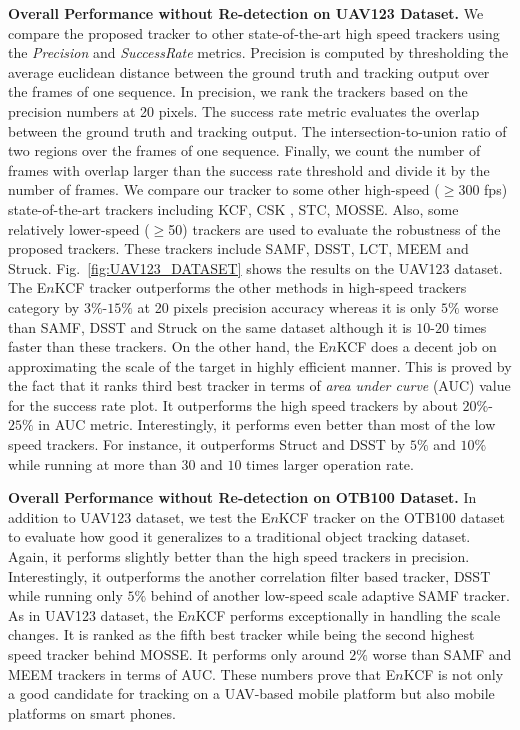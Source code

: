 \documentclass{bmvc2k}
\begin{document}
\textbf{Overall Performance without Re-detection on UAV123 Dataset.}
We compare the proposed tracker to other state-of-the-art high speed
trackers using the \textit{Precision} and \textit{Success\:Rate}
metrics. Precision is computed by thresholding the average euclidean
distance between the ground truth and tracking output over the frames
of one sequence. In precision, we rank the trackers based on the
precision numbers at 20 pixels. The success rate metric evaluates the
overlap between the ground truth and tracking output. The
intersection-to-union ratio of two regions over the frames of one
sequence. Finally, we count the number of frames with overlap larger
than the success rate threshold and divide it by the number of
frames. We compare our tracker to some other high-speed ($\geq$300
fps) state-of-the-art trackers including KCF\cite{henriques2015high},
CSK \cite{henriques2012exploiting}, STC\cite{zhang2014fast},
MOSSE\cite{bolme2010visual,henriques2015high}. Also, some relatively
lower-speed ($\geq$50) trackers are used to evaluate the robustness of
the proposed trackers. These trackers include SAMF\cite{li2014scale},
DSST\cite{danelljan2014accurate}, LCT\cite{ma2015long},
MEEM\cite{zhang2014meem} and Struck\cite{hare2012efficient}.
Fig.~\ref{fig:UAV123_DATASET} shows the results on the UAV123
dataset. The E$n$KCF tracker outperforms the other methods in
high-speed trackers category by $3\%$-$15\%$ at 20 pixels precision
accuracy whereas it is only $5\%$ worse than SAMF, DSST and Struck on
the same dataset although it is $10$-$20$ times faster than these
trackers. On the other hand, the E$n$KCF does a decent job on
approximating the scale of the target in highly efficient manner. This
is proved by the fact that it ranks third best tracker in terms of
\textit{area under curve} (AUC) value for the success rate plot. It
outperforms the high speed trackers by about $20\%$-$25\%$ in AUC
metric. Interestingly, it performs even better than most of the low
speed trackers. For instance, it outperforms Struct and DSST by $5\%$
and $10\%$ while running at more than $30$ and $10$ times larger
operation rate.

\textbf{Overall Performance without Re-detection on OTB100 Dataset.}
In addition to UAV123 dataset, we test the E$n$KCF tracker on the
OTB100 dataset to evaluate how good it generalizes to a traditional
object tracking dataset. Again, it performs slightly better than the
high speed trackers in precision. Interestingly, it outperforms the
another correlation filter based tracker, DSST while running only
$5\%$ behind of another low-speed scale adaptive SAMF tracker. As in
UAV123 dataset, the E$n$KCF performs exceptionally in handling the
scale changes. It is ranked as the fifth best tracker while being the
second highest speed tracker behind MOSSE. It performs only around
$2\%$ worse than SAMF and MEEM trackers in terms of AUC. These numbers
prove that E$n$KCF is not only a good candidate for tracking on a
UAV-based mobile platform but also mobile platforms on smart phones.
\end{document}
